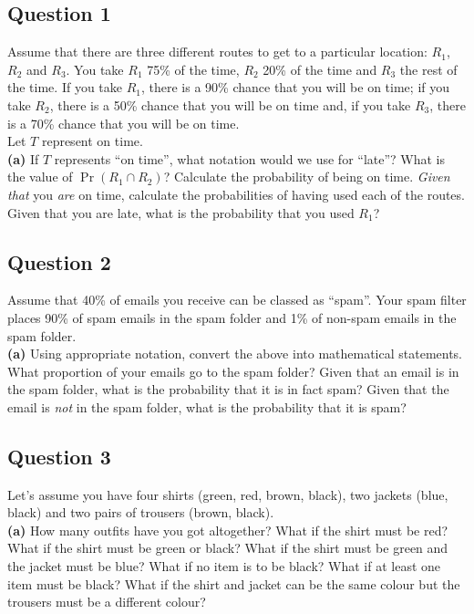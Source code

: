 \documentclass[12pt]{article}
\begin{document}
\subsection*{Question 1}
Assume that there are three different routes to get to a particular location: $R_1$, $R_2$ and $R_3$. You take $R_1$ 75\% of the time, $R_2$ 20\% of the time and $R_3$ the rest of the time. If you take $R_1$, there is a 90\% chance that you will be on time; if you take $R_2$, there is a 50\% chance that you will be on time and, if you take $R_3$, there is a 70\% chance that you will be on time. \\[0.1cm]
Let $T$ represent on time.\\[-0.2cm]

{\bf(a)} If $T$ represents ``on time'', what notation would we use for ``late''?  What is the value of $\Pr(R_1 \cap R_2)$?  Calculate the probability of being on time.  \emph{Given that} you \emph{are} on time, calculate the probabilities of having used each of the routes.  Given that you are late, what is the probability that you used $R_1$?


\subsection*{Question 2}
Assume that 40\% of emails you receive can be classed as ``spam''. Your spam filter places 90\% of spam emails in the spam folder and 1\% of non-spam emails in the spam folder.\\[-0.2cm]


{\bf(a)} Using appropriate notation, convert the above into mathematical statements.  What proportion of your emails go to the spam folder?  Given that an email is in the spam folder, what is the probability that it is in fact spam?  Given that the email is \emph{not} in the spam folder, what is the probability that it is spam?


\subsection*{Question 3}
Let's assume you have four shirts (green, red, brown, black), two jackets (blue, black) and two pairs of trousers (brown, black).\\[-0.2cm]

{\bf(a)} How many outfits have you got altogether?  What if the shirt must be red?  What if the shirt must be green or black?  What if the shirt must be green and the jacket must be blue?  What if no item is to be black?  What if at least one item must be black?  What if the shirt and jacket can be the same colour but the trousers must be a different colour?
\end{document}
